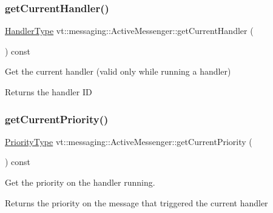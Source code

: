 \subsubsection{\texorpdfstring{get\+Current\+Handler()}{getCurrentHandler()}}
{\footnotesize\ttfamily \hyperlink{namespacevt_af64846b57dfcaf104da3ef6967917573}{Handler\+Type} vt\+::messaging\+::\+Active\+Messenger\+::get\+Current\+Handler (\begin{DoxyParamCaption}{ }\end{DoxyParamCaption}) const}



Get the current handler (valid only while running a handler) 

\begin{DoxyReturn}{Returns}
the handler ID 
\end{DoxyReturn}
\mbox{\label{structvt_1_1messaging_1_1_active_messenger_a170f37d23b8cad11dac0de0dec556ef6}} 
\subsubsection{\texorpdfstring{get\+Current\+Priority()}{getCurrentPriority()}}
{\footnotesize\ttfamily \hyperlink{namespacevt_a86bff9f556eb761b27fc8600d006ac04}{Priority\+Type} vt\+::messaging\+::\+Active\+Messenger\+::get\+Current\+Priority (\begin{DoxyParamCaption}{ }\end{DoxyParamCaption}) const}



Get the priority on the handler running. 

\begin{DoxyReturn}{Returns}
the priority on the message that triggered the current handler 
\end{DoxyReturn}
\mbox{\label{structvt_1_1messaging_1_1_active_messenger_abfa87fe46bbb97786ba2dcd923da8c39}} 
